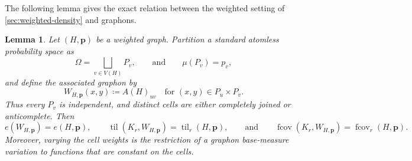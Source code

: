 \documentclass[10pt]{article}
\numberwithin{equation}{section}
\newtheorem{lemma}[lemma]{Lemma}
\newcommand{\til}{\operatorname{til}}
\newcommand{\fcov}{\operatorname{fcov}}
\newcommand{\vct}[1]{\boldsymbol{#1}}
\begin{document}
The following lemma gives the exact relation between the weighted setting of \cref{sec:weighted-density} and graphons.

\begin{lemma}\label{lem:weighted-step-graphon}
Let $(H,\vct p)$ be a weighted graph.  Partition a standard atomless probability space as
\[
 \Omega=\bigsqcup_{v\in V(H)}P_v,
 \qquad\text{and}\qquad
 \mu(P_v)=p_v,
\]
and define the \emph{associated graphon} by
\begin{equation}\label{eq:weighted-step-graphon}
 W_{H,\vct p}(x,y)\coloneqq A(H)_{uv}
 \quad\text{for }(x,y)\in P_u\times P_v.
\end{equation}
Thus every $P_v$ is independent, and distinct cells are either completely joined or anticomplete.  Then
\begin{equation}\label{eq:weighted-step-identities}
 e(W_{H,\vct p})=e(H,\vct p),
 \qquad
 \til(K_r,W_{H,\vct p})=\til_r(H,\vct p),
 \qquad\text{and}\qquad
 \fcov(K_r,W_{H,\vct p})=\fcov_r(H,\vct p).
\end{equation}
Moreover, varying the cell weights is the restriction of a graphon base-measure variation to functions that are constant on the cells.
\end{lemma}
\end{document}
